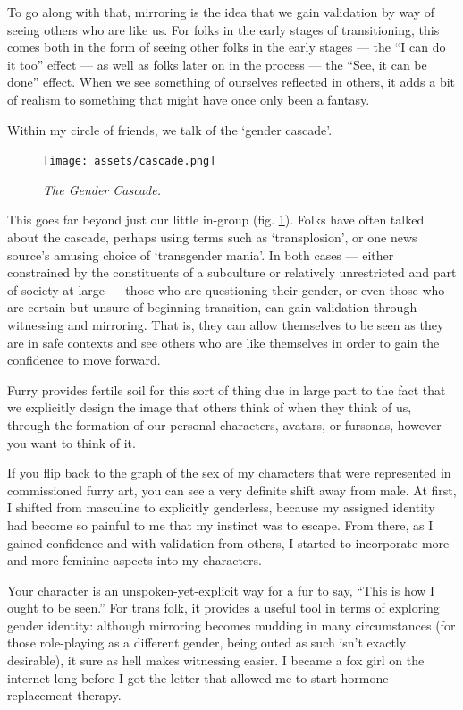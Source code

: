 To go along with that, mirroring is the idea that we gain validation by way of seeing others who are like us.  For folks in the early stages of transitioning, this comes both in the form of seeing other folks in the early stages --- the ``I can do it too'' effect --- as well as folks later on in the process --- the ``See, it can be done'' effect.  When we see something of ourselves reflected in others, it adds a bit of realism to something that might have once only been a fantasy.

Within my circle of friends, we talk of the `gender cascade'.

\begin{figure}
  \centering
  \texttt{[image: assets/cascade.png]}
  \caption{\textit{The Gender Cascade.}}
  \label{fig:cascade}
\end{figure}

This goes far beyond just our little in-group (fig. \ref{fig:cascade}).  Folks have often talked about the cascade, perhaps using terms such as `transplosion', or one news source's amusing choice of `transgender mania'.  In both cases --- either constrained by the constituents of a subculture or relatively unrestricted and part of society at large --- those who are questioning their gender, or even those who are certain but unsure of beginning transition, can gain validation through witnessing and mirroring.  That is, they can allow themselves to be seen as they are in safe contexts and see others who are like themselves in order to gain the confidence to move forward.

Furry provides fertile soil for this sort of thing due in large part to the fact that we explicitly design the image that others think of when they think of us, through the formation of our personal characters, avatars, or fursonas, however you want to think of it.

If you flip back to the graph of the sex of my characters that were represented in commissioned furry art, you can see a very definite shift away from male.  At first, I shifted from masculine to explicitly genderless, because my assigned identity had become so painful to me that my instinct was to escape.  From there, as I gained confidence and with validation from others, I started to incorporate more and more feminine aspects into my characters.

Your character is an unspoken-yet-explicit way for a fur to say, ``This is how I ought to be seen.''  For trans folk, it provides a useful tool in terms of exploring gender identity: although mirroring becomes mudding in many circumstances (for those role-playing as a different gender, being outed as such isn't exactly desirable), it sure as hell makes witnessing easier.  I became a fox girl on the internet long before I got the letter that allowed me to start hormone replacement therapy.

